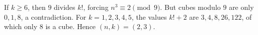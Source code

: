 If $k\ge6$, then $9$ divides $k!$, forcing $n^3\equiv2\pmod9$. But cubes modulo $9$ are only $0,1,8$, a contradiction. For $k=1,2,3,4,5$, the values $k!+2$ are $3,4,8,26,122$, of which only $8$ is a cube. Hence $\boxed{(n,k)=(2,3)}$.

